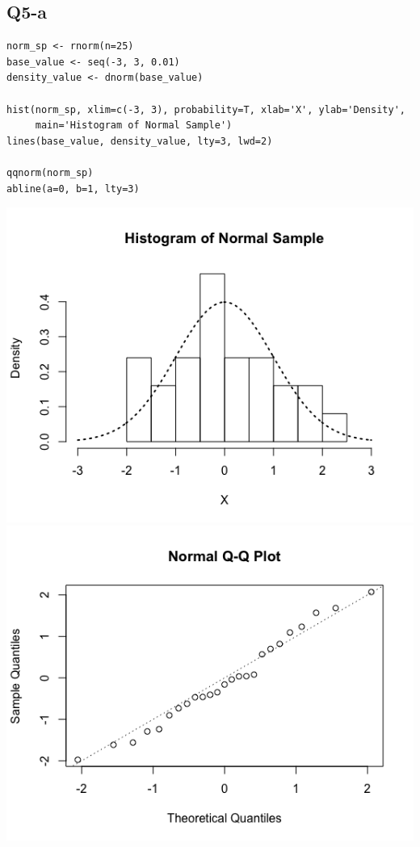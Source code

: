 \documentclass[11pt,letterpaper]{article}
\begin{document}
\subsection*{Q5-a}

\begin{verbatim}
norm_sp <- rnorm(n=25)
base_value <- seq(-3, 3, 0.01)
density_value <- dnorm(base_value)

hist(norm_sp, xlim=c(-3, 3), probability=T, xlab='X', ylab='Density',
     main='Histogram of Normal Sample')
lines(base_value, density_value, lty=3, lwd=2)

qqnorm(norm_sp)
abline(a=0, b=1, lty=3)
\end{verbatim}

\hspace*{-0.5 in} 
\includegraphics[scale=0.5]{q5-a.png}
\includegraphics[scale=0.5]{q5-a-2.png}
\end{document}

